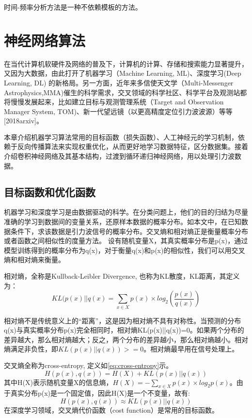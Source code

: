 时间-频率分析方法是一种不依赖模板的方法。


\section{神经网络算法}

在当代计算机软硬件及网络的普及下，计算机的计算、存储和搜索能力显著提升，又因为大数据，由此打开了机器学习（Machine Learning, ML)、深度学习(Deep Learning, DL)\cite{Goodfellow_2016_MITpress} 的新格局。另一方面，近年来多信使天文学（Multi-Messenger Astrophysics,MMA)催生的科学需求，交叉领域的科学社区、科学平台及观测站都将慢慢发展起来，比如建立目标与观测管理系统（Target and Observation Manager System, TOM)、新一代望远镜（以更高精度定位引力波波源）等等[2018arxiv]。


本章介绍机器学习算法常用的目标函数（损失函数）、人工神经元的学习机制，依赖于反向传播算法来实现权重优化，从而更好地学习数据特征，区分数据集。接着介绍卷积神经网络及其基本结构，过渡到循环递归神经网络，用以处理引力波数据。

\subsection{目标函数和优化函数}

机器学习和深度学习\cite{Goodfellow_2016_MITpress, zhou2016machine, huang2017deep}是由数据驱动的科学。在分类问题上，他们的目的归结为尽量准确的学习到数据间的变量关系，还原样本数据的概率分布。如本文中，在已知数据条件下，求该数据是引力波信号的概率分布。交叉熵和相对熵正是衡量概率分布或者函数之间相似性的度量方法。
设有随机变量X，其真实概率分布是p(x)，通过模型训练得到的概率分布为q(x)，对于衡量q(x)和p(x)的相似性，我们可以用交叉熵和相对熵来衡量。

相对熵，全称是Kullback-Leibler Divergence, 也称为KL散度，KL距离，其定义为：
$$KL(p(x)||q(x)=\sum_{x \in X} p(x) \times log_2{(\frac{p(x)}{q(x)})} $$

相对熵不是传统意义上的“距离”，这是因为相对熵不具有对称性。当预测的分布q(x)与真实概率分布p(x)完全相同时，相对熵KL(p(x)||q(x))=0。如果两个分布的差异越大，那么相对熵越大；反之，两个分布的差异越小，那么相对熵越小。相对熵满足非负性，即$KL(p(x)||q(x))>=0$。相对熵最早用在信号处理上。

交叉熵全称为cross-entropy, 定义如\ref{eq:cross-entropy}示。
\begin{equation}
\label{eq:cross-entropy}
    H(p(x),q(x))=H(X) +KL(p(x)||q(x))
\end{equation}
其中H(X)表示随机变量X的信息熵，$H(X)=-\sum_{x \in X}p(x) \times log_2 p(x)$。由于真实分布p(x)是一个固定值，因此H(X)是一个不变量，故有:
$$H(p(x),q(x)) \approx KL(p(x)||q(x))$$
在深度学习领域，交叉熵代价函数（cost function）是常用的目标函数。

